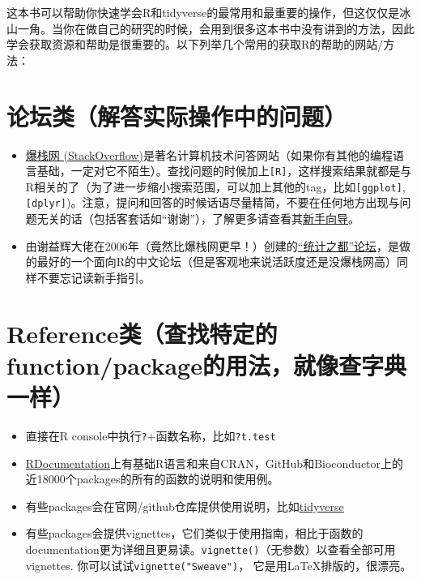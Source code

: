 \documentclass[]{book}
\providecommand{\tightlist}{%
  \setlength{\itemsep}{0pt}\setlength{\parskip}{0pt}}
\begin{document}
这本书可以帮助你快速学会R和tidyverse的最常用和最重要的操作，但这仅仅是冰山一角。当你在做自己的研究的时候，会用到很多这本书中没有讲到的方法，因此学会获取资源和帮助是很重要的。以下列举几个常用的获取R的帮助的网站/方法：

\section{论坛类（解答实际操作中的问题）}

\begin{itemize}
\tightlist
\item
  \href{https://stackoverflow.com}{爆栈网 (StackOverflow)}是著名计算机技术问答网站（如果你有其他的编程语言基础，一定对它不陌生）。查找问题的时候加上\texttt{{[}R{]}}，这样搜索结果就都是与R相关的了（为了进一步缩小搜索范围，可以加上其他的tag，比如\texttt{{[}ggplot{]}}, \texttt{{[}dplyr{]}})。注意，提问和回答的时候话语尽量精简，不要在任何地方出现与问题无关的话（包括客套话如``谢谢''），了解更多请查看其\href{https://stackoverflow.com/tour}{新手向导}。
\item
  由谢益辉大佬在2006年（竟然比爆栈网更早！）创建的\href{https://d.cosx.org}{``统计之都''论坛}，是做的最好的一个面向R的中文论坛（但是客观地来说活跃度还是没爆栈网高）同样不要忘记读新手指引。
\end{itemize}

\hypertarget{referencefunctionpackage}{%
\section{Reference类（查找特定的function/package的用法，就像查字典一样）}\label{referencefunctionpackage}}

\begin{itemize}
\tightlist
\item
  直接在R console中执行\texttt{?}+函数名称，比如\texttt{?t.test}
\item
  \href{https://www.rdocumentation.org}{RDocumentation}上有基础R语言和来自CRAN，GitHub和Bioconductor上的近18000个packages的所有的函数的说明和使用例。
\item
  有些packages会在官网/github仓库提供使用说明，比如\href{https://www.tidyverse.org}{tidyverse}
\item
  有些packages会提供vignettes，它们类似于使用指南，相比于函数的documentation更为详细且更易读。\texttt{vignette()}（无参数）以查看全部可用vignettes. 你可以试试\texttt{vignette("Sweave")}， 它是用LaTeX排版的，很漂亮。
\end{itemize}
\end{document}
